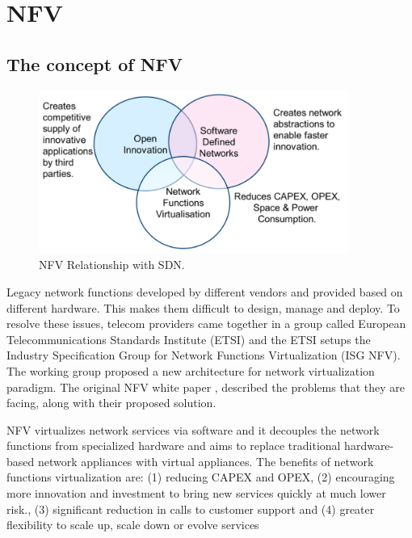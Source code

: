 \section{NFV} \label{sec:nfv}

\subsection{The concept of NFV}

\begin{figure}[!t]
\centering
\includegraphics[width=0.9\textwidth]{./fig/nfv_and_sdn.png}
\caption{NFV Relationship with SDN. \cite{nfv-wp}}
\label{fig:nfv_and_sdn}
\end{figure}

Legacy network functions developed by different vendors and provided based on different hardware. This makes them difficult to design, manage and deploy.
To resolve these issues, telecom providers came together in a group called European Telecommunications Standards Institute (ETSI) and the ETSI setups the Industry Specification Group for Network Functions Virtualization (ISG NFV). The working group proposed a new architecture for network virtualization paradigm. The original NFV white paper \cite{nfv-wp}, described the problems that they are facing, along with their proposed solution.

NFV virtualizes network services via software and it decouples the network functions from specialized hardware and aims to replace traditional hardware-based network appliances with virtual appliances.
The benefits of network functions virtualization are: (1) reducing CAPEX and OPEX, (2) encouraging more innovation and investment to bring new services quickly at much lower risk., (3) significant reduction in calls to customer support and (4) greater flexibility to scale up, scale down or evolve services



